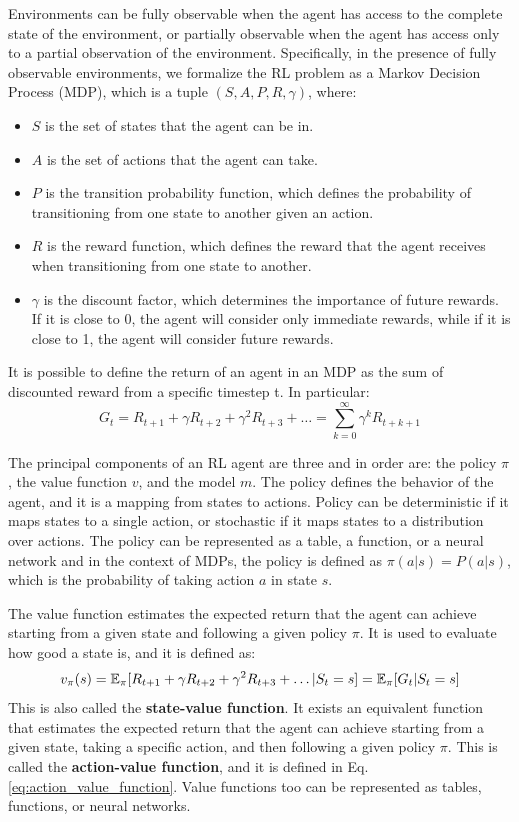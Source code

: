 Environments can be fully observable when the agent has access to the complete state of the environment, or partially observable when the agent has access only to a partial observation of the environment.
Specifically, in the presence of fully observable environments, we formalize the RL problem as a Markov Decision Process (MDP), which is a tuple $(S, A, P, R, \gamma)$, where:
\begin{itemize}
    \item $S$ is the set of states that the agent can be in.
    \item $A$ is the set of actions that the agent can take.
    \item $P$ is the transition probability function, which defines the probability of transitioning from one state to another given an action.
    \item $R$ is the reward function, which defines the reward that the agent receives when transitioning from one state to another.
    \item $\gamma$ is the discount factor, which determines the importance of future rewards.
    If it is close to 0, the agent will consider only immediate rewards, while if it is close to 1, the agent will consider future rewards.
\end{itemize}

It is possible to define the return of an agent in an MDP as the sum of discounted reward from a specific timestep t.
In particular:
\begin{equation} \label{eq:return}
    G_t = R_{t+1} + \gamma R_{t+2} + \gamma^2 R_{t+3} + \dots = \sum_{k=0}^{\infty} \gamma^k R_{t+k+1}
\end{equation}

The principal components of an RL agent are three and in order are: the policy $\pi$, the value function $v$, and the model $m$.
The policy defines the behavior of the agent, and it is a mapping from states to actions.
Policy can be deterministic if it maps states to a single action, or stochastic if it maps states to a distribution over actions.
The policy can be represented as a table, a function, or a neural network and in the context of MDPs, the policy is defined as $\pi(a|s) = P(a|s)$, which is the probability of taking action $a$ in state $s$.


The value function estimates the expected return that the agent can achieve starting from a given state and following a given policy $\pi$.
It is used to evaluate how good a state is, and it is defined as:
\begin{equation} \label{eq:value_function}
    v_{\pi}(s) = \operatorname{\mathbb{E}}_{\pi}[R_{t+1} + \gamma R_{t+2} + \gamma^2 R_{t+3} + \dots | S_t = s] = \operatorname{\mathbb{E}}_{\pi}[G_t | S_t = s]
\end{equation}
This is also called the \textbf{state-value function}.
It exists an equivalent function that estimates the expected return that the agent can achieve starting from a given state, taking a specific action, and then following a given policy $\pi$.
This is called the \textbf{action-value function}, and it is defined in Eq. \ref{eq:action_value_function}.
Value functions too can be represented as tables, functions, or neural networks.

